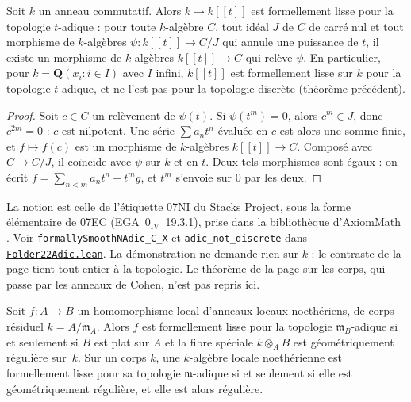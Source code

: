 \begin{encadre}
\begin{theoreme}
Soit $k$ un anneau commutatif. Alors $k \to k[[t]]$ est formellement lisse pour la topologie $t$-adique : pour toute $k$-algèbre $C$, tout idéal $J$ de $C$ de carré nul et tout morphisme de $k$-algèbres $\psi : k[[t]] \to C/J$ qui annule une puissance de $t$, il existe un morphisme de $k$-algèbres $k[[t]] \to C$ qui relève $\psi$. En particulier, pour $k = \mathbf Q(x_i : i \in I)$ avec $I$ infini, $k[[t]]$ est formellement lisse sur $k$ pour la topologie $t$-adique, et ne l'est pas pour la topologie discrète (théorème précédent).
\end{theoreme}
\end{encadre}

\begin{proof}
Soit $c \in C$ un relèvement de $\psi(t)$. Si $\psi(t^m) = 0$, alors $c^m \in J$, donc $c^{2m} = 0$ : $c$ est nilpotent. Une série $\sum a_n t^n$ évaluée en $c$ est alors une somme finie, et $f \mapsto f(c)$ est un morphisme de $k$-algèbres $k[[t]] \to C$. Composé avec $C \to C/J$, il coïncide avec $\psi$ sur $k$ et en $t$. Deux tels morphismes sont égaux : on écrit $f = \sum_{n < m} a_n t^n + t^m g$, et $t^m$ s'envoie sur $0$ par les deux.
\end{proof}

\noindent La notion est celle de l'étiquette 07NI du Stacks Project, sous la forme élémentaire de 07EC (EGA~$0_{\mathrm{IV}}$~19.3.1), prise dans la bibliothèque d'AxiomMath \cite{axiomstacks}. Voir \texttt{formallySmoothNAdic\_C\_X} et \texttt{adic\_not\_discrete} dans \href{\leanblobmain/RingTheory/Folder22Adic.lean}{\texttt{Folder22Adic.\allowbreak{}lean}}. La démonstration ne demande rien sur $k$ : le contraste de la page tient tout entier à la topologie. Le théorème de la page sur les corps, qui passe par les anneaux de Cohen, n'est pas repris ici.

\begin{encadre}
\begin{theoreme}
Soit $f : A \to B$ un homomorphisme local d'anneaux locaux noethériens, de corps résiduel $k = A/\mathfrak m_A$. Alors $f$ est formellement lisse pour la topologie $\mathfrak m_B$-adique si et seulement si $B$ est plat sur $A$ et la fibre spéciale $k \otimes_A B$ est géométriquement régulière sur~$k$. Sur un corps $k$, une $k$-algèbre locale noethérienne est formellement lisse pour sa topologie $\mathfrak m$-adique si et seulement si elle est géométriquement régulière, et elle est alors régulière.
\end{theoreme}
\end{encadre}

